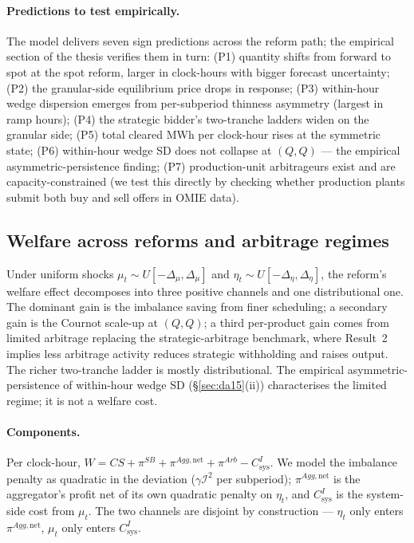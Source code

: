 \documentclass[11pt]{article}
\begin{document}
\paragraph{Predictions to test empirically.} The model delivers seven sign predictions across the reform path; the empirical section of the thesis verifies them in turn:
(P1) quantity shifts from forward to spot at the spot reform, larger in clock-hours with bigger forecast uncertainty;
(P2) the granular-side equilibrium price drops in response;
(P3) within-hour wedge dispersion emerges from per-subperiod thinness asymmetry (largest in ramp hours);
(P4) the strategic bidder's two-tranche ladders widen on the granular side;
(P5) total cleared MWh per clock-hour rises at the symmetric state;
(P6) within-hour wedge SD does not collapse at $(Q,Q)$ --- the empirical asymmetric-persistence finding;
(P7) production-unit arbitrageurs exist and are capacity-constrained (we test this directly by checking whether production plants submit both buy and sell offers in OMIE data).

\subsection{Welfare across reforms and arbitrage regimes}\label{sec:welfare}

Under uniform shocks $\mu_t \sim U[-\Delta_\mu, \Delta_\mu]$ and $\eta_t \sim U[-\Delta_\eta, \Delta_\eta]$, the reform's welfare effect decomposes into three positive channels and one distributional one. The dominant gain is the imbalance saving from finer scheduling; a secondary gain is the Cournot scale-up at $(Q,Q)$; a third per-product gain comes from limited arbitrage replacing the strategic-arbitrage benchmark, where \citet{ito_reguant_2016} Result~2 implies less arbitrage activity reduces strategic withholding and raises output. The richer two-tranche ladder is mostly distributional. The empirical asymmetric-persistence of within-hour wedge SD (\S\ref{sec:da15}(ii)) characterises the limited regime; it is not a welfare cost.

\paragraph{Components.} Per clock-hour, $W = CS + \pi^{SB} + \pi^{Agg,\text{net}} + \pi^{Arb} - C^I_{\text{sys}}$. We model the imbalance penalty as quadratic in the deviation ($\gamma \mathcal{I}^2$ per subperiod); $\pi^{Agg,\text{net}}$ is the aggregator's profit net of its own quadratic penalty on $\eta_t$, and $C^I_{\text{sys}}$ is the system-side cost from $\mu_t$. The two channels are disjoint by construction --- $\eta_t$ only enters $\pi^{Agg,\text{net}}$, $\mu_t$ only enters $C^I_{\text{sys}}$.
\end{document}
